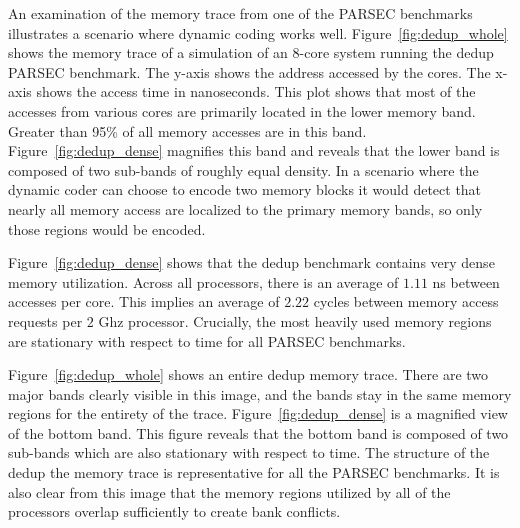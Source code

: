An examination of the memory trace from one of the PARSEC benchmarks illustrates a scenario where dynamic coding works well. Figure~\ref{fig:dedup_whole} shows the memory trace of a simulation of an 8-core system running the dedup PARSEC benchmark. The y-axis shows the address accessed by the cores. The x-axis shows the access time in nanoseconds. This plot shows that most of the accesses from various cores are primarily located in the lower memory band. Greater than 95\% of all memory accesses are in this band. Figure~\ref{fig:dedup_dense} magnifies this band and reveals that the lower band is composed of two sub-bands of roughly equal density. In a scenario where the dynamic coder can choose to encode two memory blocks it would detect that nearly all memory access are localized to the primary memory bands, so only those regions would be encoded.


Figure~\ref{fig:dedup_dense} shows that the dedup benchmark contains very dense memory utilization. Across all processors, there is an average of $1.11$ ns between accesses per core. This implies an average of $2.22$ cycles between memory access requests per $2$ Ghz processor. Crucially, the most heavily used memory regions are stationary with respect to time for all PARSEC benchmarks. 

Figure~\ref{fig:dedup_whole} shows an entire dedup memory trace. There are two major bands clearly visible in this image, and the bands stay in the same memory regions for the entirety of the trace. Figure~\ref{fig:dedup_dense} is a magnified view of the bottom band. This figure reveals that the bottom band is composed of two sub-bands which are also stationary with respect to time. The structure of the dedup the memory trace is representative for all the PARSEC benchmarks. It is also clear from this image that the memory regions utilized by all of the processors overlap sufficiently to create bank conflicts.

